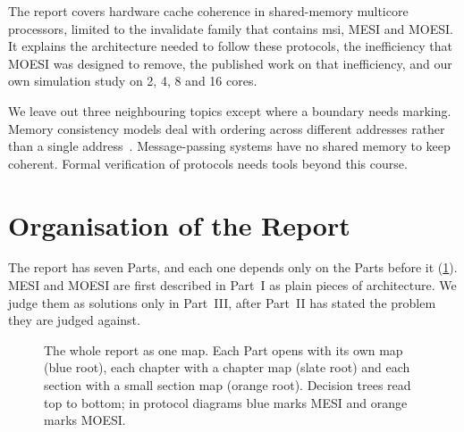The report covers hardware cache coherence in shared-memory multicore processors,
limited to the \gls{invalidate} family that contains \gls{msi}, MESI and MOESI. It
explains the architecture needed to follow these protocols, the inefficiency that
MOESI was designed to remove, the published work on that inefficiency, and our own
simulation study on 2, 4, 8 and 16 cores.

We leave out three neighbouring topics except where a boundary needs marking.
Memory consistency models deal with ordering across different addresses rather
than a single address~\cite[\S12.4.3]{sarangi2025basic}. Message-passing systems
have no shared memory to keep coherent. Formal verification of protocols needs
tools beyond this course.

\section{Organisation of the Report}
\label{sec:intro-parts}
%

The report has seven Parts, and each one depends only on the Parts before it
(\cref{fig:report-map}). MESI and MOESI are first described in Part~I
as plain pieces of architecture. We judge them as solutions only in Part~III,
after Part~II has stated the problem they are judged against.

\begin{figure}[htbp]
\centering
{}
\caption[]{The whole report as one map. Each Part
opens with its own map (blue root), each chapter with a chapter map (slate root)
and each section with a small section map (orange root). Decision trees read top
to bottom; in protocol diagrams blue marks MESI and orange marks MOESI.}
\label{fig:report-map}
\end{figure}

